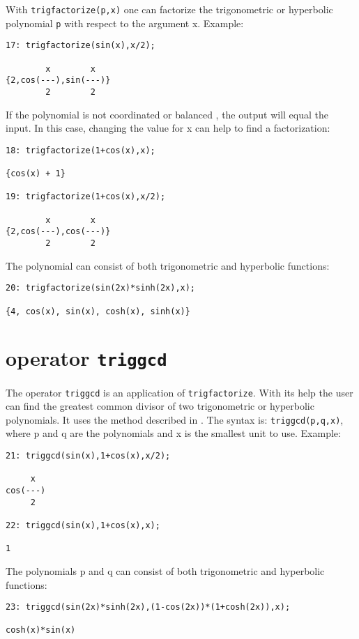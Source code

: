 With {\tt trigfactorize(p,x)} one can factorize the trigonometric or
hyperbolic polynomial {\tt p} with respect to the argument x. Example:
{\small
\begin{verbatim}
17: trigfactorize(sin(x),x/2);

        x        x
{2,cos(---),sin(---)}
        2        2
\end{verbatim}
}\noindent

If the polynomial is not coordinated or balanced \cite{art},
the output will equal the input.
In this case, changing the value for x can help to find a factorization:
{\small
\begin{verbatim}
18: trigfactorize(1+cos(x),x);

{cos(x) + 1}

19: trigfactorize(1+cos(x),x/2);

        x        x
{2,cos(---),cos(---)}
        2        2
\end{verbatim}
}\noindent

The polynomial can consist of both trigonometric and hyperbolic functions:
{\small
\begin{verbatim}
20: trigfactorize(sin(2x)*sinh(2x),x);

{4, cos(x), sin(x), cosh(x), sinh(x)}
\end{verbatim}
}\noindent

\section{\REDUCE{} operator {\tt triggcd}}

The operator {\tt triggcd} is an application of {\tt trigfactorize}.
With its help the user can find the greatest common divisor of two
trigonometric or hyperbolic polynomials. It uses the method described
in \cite{art}. The syntax is: {\tt triggcd(p,q,x)}, where p and q
are the polynomials and x is the smallest unit to use. Example:

{\small
\begin{verbatim}
21: triggcd(sin(x),1+cos(x),x/2);

     x
cos(---)
     2

22: triggcd(sin(x),1+cos(x),x);

1
\end{verbatim}
}\noindent

The polynomials p and q can consist of both trigonometric and hyperbolic
functions:
{\small
\begin{verbatim}
23: triggcd(sin(2x)*sinh(2x),(1-cos(2x))*(1+cosh(2x)),x);

cosh(x)*sin(x)
\end{verbatim}
}\noindent


